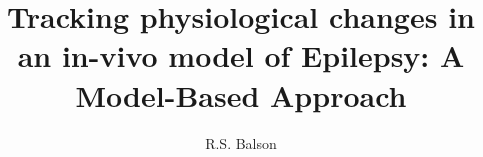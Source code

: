 \documentclass[a4paper,twoside,10pt]{article}%
\begin{document}
\title{Tracking physiological changes in an in-vivo model of Epilepsy: A Model-Based Approach}
\author{R.S. Balson}
\maketitle


















\end{document}
